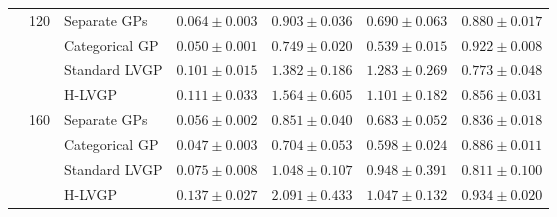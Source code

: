 \begin{table}[htbp]
\begin{tabular}{lllrrrr}
\cmidrule(lr){2-7}
 & \multirow{4}{*}{120} & Separate GPs & $0.064 \pm 0.003$ & $0.903 \pm 0.036$ & $0.690 \pm 0.063$ & $0.880 \pm 0.017$ \\
 &  & Categorical GP & \colorbox{green!20}{\boldmath$0.050 \pm 0.001$} & \colorbox{green!20}{\boldmath$0.749 \pm 0.020$} & \colorbox{green!20}{\boldmath$0.539 \pm 0.015$} & \colorbox{green!20}{\boldmath$0.922 \pm 0.008$} \\
 &  & Standard LVGP & $0.101 \pm 0.015$ & $1.382 \pm 0.186$ & $1.283 \pm 0.269$ & $0.773 \pm 0.048$ \\
 &  & H-LVGP & $0.111 \pm 0.033$ & $1.564 \pm 0.605$ & $1.101 \pm 0.182$ & $0.856 \pm 0.031$ \\
\cmidrule(lr){2-7}
 & \multirow{4}{*}{160} & Separate GPs & $0.056 \pm 0.002$ & $0.851 \pm 0.040$ & $0.683 \pm 0.052$ & $0.836 \pm 0.018$ \\
 &  & Categorical GP & \colorbox{green!20}{\boldmath$0.047 \pm 0.003$} & \colorbox{green!20}{\boldmath$0.704 \pm 0.053$} & \colorbox{green!20}{\boldmath$0.598 \pm 0.024$} & $0.886 \pm 0.011$ \\
 &  & Standard LVGP & $0.075 \pm 0.008$ & $1.048 \pm 0.107$ & $0.948 \pm 0.391$ & $0.811 \pm 0.100$ \\
 &  & H-LVGP & $0.137 \pm 0.027$ & $2.091 \pm 0.433$ & $1.047 \pm 0.132$ & \colorbox{green!20}{\boldmath$0.934 \pm 0.020$} \\
\bottomrule
\end{tabular}
\end{table}
